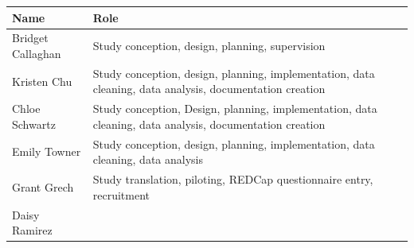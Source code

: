 \documentclass[]{book}
\begin{document}
\begin{longtable}[]{@{}ll@{}}
\toprule
\begin{minipage}[b]{0.22\columnwidth}\raggedright
Name\strut
\end{minipage} & \begin{minipage}[b]{0.72\columnwidth}\raggedright
Role\strut
\end{minipage}\tabularnewline
\midrule
\endhead
\begin{minipage}[t]{0.22\columnwidth}\raggedright
Bridget Callaghan\strut
\end{minipage} & \begin{minipage}[t]{0.72\columnwidth}\raggedright
Study conception, design, planning, supervision\strut
\end{minipage}\tabularnewline
\begin{minipage}[t]{0.22\columnwidth}\raggedright
Kristen Chu\strut
\end{minipage} & \begin{minipage}[t]{0.72\columnwidth}\raggedright
Study conception, design, planning, implementation, data cleaning, data analysis, documentation creation\strut
\end{minipage}\tabularnewline
\begin{minipage}[t]{0.22\columnwidth}\raggedright
Chloe Schwartz\strut
\end{minipage} & \begin{minipage}[t]{0.72\columnwidth}\raggedright
Study conception, Design, planning, implementation, data cleaning, data analysis, documentation creation\strut
\end{minipage}\tabularnewline
\begin{minipage}[t]{0.22\columnwidth}\raggedright
Emily Towner\strut
\end{minipage} & \begin{minipage}[t]{0.72\columnwidth}\raggedright
Study conception, design, planning, implementation, data cleaning, data analysis\strut
\end{minipage}\tabularnewline
\begin{minipage}[t]{0.22\columnwidth}\raggedright
Grant Grech\strut
\end{minipage} & \begin{minipage}[t]{0.72\columnwidth}\raggedright
Study translation, piloting, REDCap questionnaire entry, recruitment\strut
\end{minipage}\tabularnewline
\begin{minipage}[t]{0.22\columnwidth}\raggedright
Daisy Ramirez\strut

\end{minipage}
\end{longtable}
\end{document}

